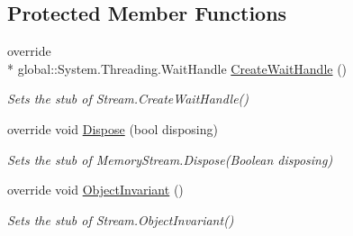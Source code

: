 \subsection*{Protected Member Functions}
\begin{DoxyCompactItemize}
\item 
override \\*
global\-::\-System.\-Threading.\-Wait\-Handle \hyperlink{class_system_1_1_i_o_1_1_fakes_1_1_stub_memory_stream_a61f63c56923cc92ee953d73926a4c82c}{Create\-Wait\-Handle} ()
\begin{DoxyCompactList}\small\item\em Sets the stub of Stream.\-Create\-Wait\-Handle()\end{DoxyCompactList}\item 
override void \hyperlink{class_system_1_1_i_o_1_1_fakes_1_1_stub_memory_stream_acf102100945782046665bee49b1d21c0}{Dispose} (bool disposing)
\begin{DoxyCompactList}\small\item\em Sets the stub of Memory\-Stream.\-Dispose(\-Boolean disposing)\end{DoxyCompactList}\item 
override void \hyperlink{class_system_1_1_i_o_1_1_fakes_1_1_stub_memory_stream_afa90ba7d741ce8a840e46128a9a57b5b}{Object\-Invariant} ()
\begin{DoxyCompactList}\small\item\em Sets the stub of Stream.\-Object\-Invariant()\end{DoxyCompactList}\end{DoxyCompactItemize}
